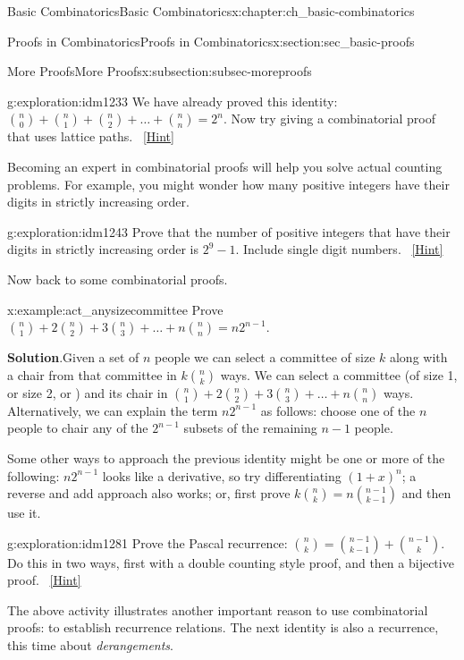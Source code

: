 \documentclass[oneside,10pt,]{book}
\numberwithin{equation}{chapter}
\begin{document}
\begin{chapterptx}{Basic Combinatorics}{}{Basic Combinatorics}{}{}{x:chapter:ch_basic-combinatorics}
\begin{sectionptx}{Proofs in Combinatorics}{}{Proofs in Combinatorics}{}{}{x:section:sec_basic-proofs}
\begin{subsectionptx}{More Proofs}{}{More Proofs}{}{}{x:subsection:subsec-moreproofs}
\begin{exploration}{}{g:exploration:idm1233}%
We have already proved this identity: \(\binom{n}{0} + \binom{n}{1} + \binom{n}{2} + \ldots + \binom{n}{n} = 2^{n}\).  Now try giving a combinatorial proof that uses lattice paths.%
\qquad~\hfill{\tiny\hyperlink{g:hint:idm1237-back}{[Hint]}}\end{exploration}
Becoming an expert in combinatorial proofs will help you solve actual counting problems.  For example, you might wonder how many positive integers have their digits in strictly increasing order.%
\begin{exploration}{}{g:exploration:idm1243}%
Prove that the number of positive integers that have their digits in strictly increasing order is \(2^{9} - 1\). Include single digit numbers.%
\qquad~\hfill{\tiny\hyperlink{g:hint:idm1247-back}{[Hint]}}\end{exploration}
Now back to some combinatorial proofs.%
\begin{example}{}{x:example:act_anysizecommittee}%
Prove \(\binom{n}{1} + 2 \binom{n}{2} + 3 \binom{n}{3} + \ldots + n \binom{n}{n} = n2^{n - 1}\).%
\par\smallskip%
\noindent\textbf{Solution}.\hypertarget{g:solution:idm1266}{}\quad{}Given a set of \(n\) people we can select a committee of size \(k\) along with a chair from that committee in \(k \binom{n}{k}\) ways. We can select a committee (of size 1, or size 2, or \textellipsis{}) and its chair in \(\binom{n}{1} + 2 \binom{n}{2} + 3 \binom{n}{3} + \ldots + n \binom{n}{n}\) ways. Alternatively, we can explain the term \(n2^{n - 1}\) as follows: choose one of the \(n\) people to chair any of the \(2^{n - 1}\) subsets of the remaining \(n - 1\) people.%
\end{example}
Some other ways to approach the previous identity might be one or more of the following: \(n2^{n - 1}\) looks like a derivative, so try differentiating \(\left( 1 + x \right)^{n}\); a reverse and add approach also works; or, first prove \(k \binom{n}{k} = n \binom{n - 1}{k - 1}\) and then use it.%
\begin{exploration}{}{g:exploration:idm1281}%
Prove the Pascal recurrence: \(\binom{n}{k} = \binom{n - 1}{k-1} + \binom{n - 1}{k}\).  Do this in two ways, first with a double counting style proof, and then a bijective proof.%
\qquad~\hfill{\tiny\hyperlink{g:hint:idm1285-back}{[Hint]}}\end{exploration}
The above activity illustrates another important reason to use combinatorial proofs: to establish recurrence relations.  The next identity is also a recurrence, this time about \emph{derangements}.%

\end{subsectionptx}
\end{sectionptx}
\end{chapterptx}
\end{document}
